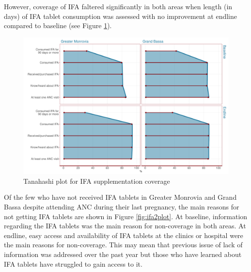 \documentclass[12pt,a4paper]{article}
\begin{document}
However, coverage of IFA faltered significantly in both areas when length (in days) of IFA tablet consumption was assessed with no improvement at endline compared to baseline (see Figure \ref{fig:ifaTanahashiPlot}).

\begin{figure}[H]

{\centering \includegraphics{liberiaCoverageFinalReport_files/figure-latex/ifaTanahashiPlot-1} 

}

\caption{Tanahashi plot for IFA supplementation coverage}\label{fig:ifaTanahashiPlot}
\end{figure}

Of the few who have not received IFA tablets in Greater Monrovia and Grand Bassa despite attending ANC during their last pregnancy, the main reasons for not getting IFA tablets are shown in Figure \ref{fig:ifa2plot}. At baseline, information regarding the IFA tablets was the main reason for non-coverage in both areas. At endline, easy access and availability of IFA tablets at the clinics or hospital were the main reasons for non-coverage. This may mean that previous issue of lack of information was addressed over the past year but those who have learned about IFA tablets have struggled to gain access to it.
\end{document}
